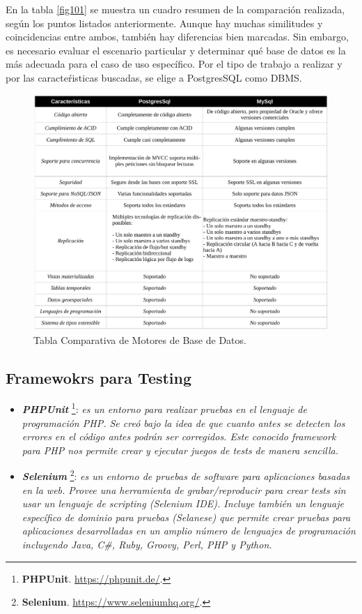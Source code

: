 \documentclass[11pt,oneside]{book}
\begin{document}
\newpage
En la tabla \eqref{fig101} se muestra un cuadro resumen de la comparación realizada, según los puntos listados anteriormente. Aunque hay muchas similitudes y coincidencias entre ambos, también hay diferencias bien marcadas. Sin embargo, es necesario evaluar el escenario particular y determinar qué base de datos es la más adecuada para el caso de uso específico. Por el tipo de trabajo a realizar y por las caracteŕisticas buscadas, se elige a PostgresSQL como DBMS.
\vspace{1cm}
\renewcommand{\figurename}{Tabla.} 
\begin{figure}[tbhp]
\centerline{\includegraphics[scale=0.8]{figs/capitulo_1_analisis/Tabla_Comparativa_DB.pdf}}
\caption{Tabla Comparativa de Motores de Base de Datos.}
\label{fig101}
\end{figure}
\renewcommand{\figurename}{Figura.}

\newpage
\subsection{Framewokrs para Testing}
\begin{itemize}
\item \textit{\textbf{PHPUnit}} \footnote{\textbf{PHPUnit}. \url{https://phpunit.de/}.}: \textit{es un entorno para realizar pruebas en el lenguaje de programación PHP. Se creó bajo la idea de que cuanto antes se detecten los errores en el código antes podrán ser corregidos. Este conocido framework para PHP nos permite crear y ejecutar juegos de tests de manera sencilla.}

\item \textit{\textbf{Selenium}} \footnote{\textbf{Selenium}. \url{https://www.seleniumhq.org/}.}: \textit{es un entorno de pruebas de software para aplicaciones basadas en la web. Provee una herramienta de grabar/reproducir para crear tests sin usar un lenguaje de scripting (Selenium IDE). Incluye también un lenguaje específico de dominio para pruebas (Selanese) que permite crear pruebas para aplicaciones desarrolladas en un amplio número de lenguajes de programación incluyendo Java, C\#, Ruby, Groovy, Perl, PHP y Python.}
\end{itemize}
\end{document}
